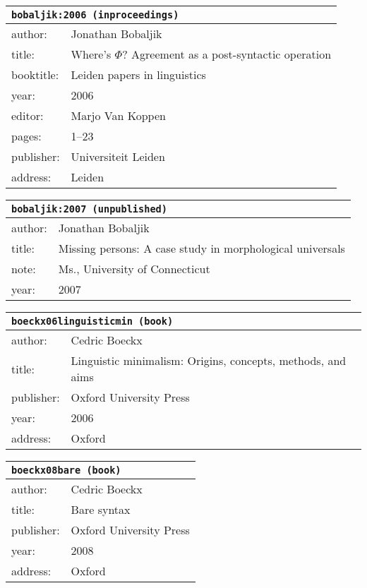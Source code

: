 \documentclass{article}
\begin{document}
\bigskip

\begin{tabular}{p{}p{}}
\multicolumn{2}{l}{\texttt{bobaljik:2006 (inproceedings)}}\\
\hline
author: & Jonathan Bobaljik\\
title: & Where's $\Phi$? Agreement as a post-syntactic operation\\
booktitle: & Leiden papers in linguistics\\
year: & 2006\\
editor: & Marjo Van Koppen\\
pages: & 1--23\\
publisher: & Universiteit Leiden\\
address: & Leiden\\
\end{tabular}

\bigskip

\begin{tabular}{p{}p{}}
\multicolumn{2}{l}{\texttt{bobaljik:2007 (unpublished)}}\\
\hline
author: & Jonathan Bobaljik\\
title: & Missing persons: A case study in morphological universals\\
note: & \textsc{M}s., University of Connecticut\\
year: & 2007\\
\end{tabular}

\bigskip

\begin{tabular}{p{}p{}}
\multicolumn{2}{l}{\texttt{boeckx06linguisticmin (book)}}\\
\hline
author: & Cedric Boeckx\\
title: & Linguistic minimalism: Origins, concepts, methods, and aims\\
publisher: & Oxford University Press\\
year: & 2006\\
address: & Oxford\\
\end{tabular}

\bigskip

\begin{tabular}{p{}p{}}
\multicolumn{2}{l}{\texttt{boeckx08bare (book)}}\\
\hline
author: & Cedric Boeckx\\
title: & Bare syntax\\
publisher: & Oxford University Press\\
year: & 2008\\
address: & Oxford\\
\end{tabular}
\end{document}
